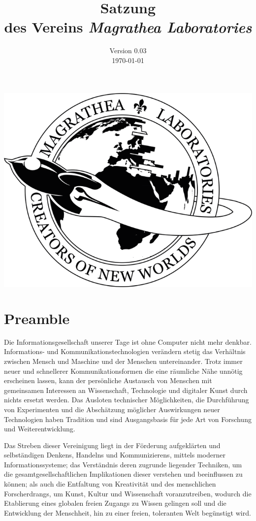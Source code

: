 \documentclass[ngerman]{article}
\title{Satzung\\
des Vereins \emph{Magrathea Laboratories}}
\date{Version 0.03\\
\today}
\begin{document}
\maketitle

\begin{center}
\emph{\includegraphics[scale=0.3]{logo}}
\par\end{center}

\thispagestyle{empty}
\pagebreak


\section{Preamble}
Die Informationsgesellschaft unserer Tage ist ohne Computer nicht mehr denkbar. Informations- und Kommunikationstechnologien verändern stetig das Verhältnis zwischen Mensch und Maschine und der Menschen untereinander. Trotz immer neuer und schnellerer Kommunikationsformen die eine  räumliche Nähe unnötig erscheinen lassen, kann der persönliche Austausch von Menschen mit gemeinsamen Interessen an Wissenschaft, Technologie und digitaler Kunst durch nichts ersetzt werden. Das Ausloten technischer Möglichkeiten, die Durchführung von Experimenten und die Abschätzung möglicher Auswirkungen neuer Technologien haben Tradition und sind Ausgangsbasis für jede Art von Forschung und Weiterentwicklung.

Das Streben dieser Vereinigung liegt in der Förderung aufgeklärten und selbständigen Denkens, Handelns und Kommunizierens, mittels moderner Informationssysteme; das Verständnis deren zugrunde liegender Techniken, um die gesamtgesellschaftlichen Implikationen dieser verstehen und beeinflussen zu können; als auch die Entfaltung von Kreativität und des menschlichen Forscherdrangs, um Kunst, Kultur und Wissenschaft voranzutreiben, wodurch die Etablierung eines globalen freien Zugangs zu Wissen gelingen soll und die Entwicklung der Menschheit, hin zu einer freien, toleranten Welt begünstigt wird.
\end{document}
